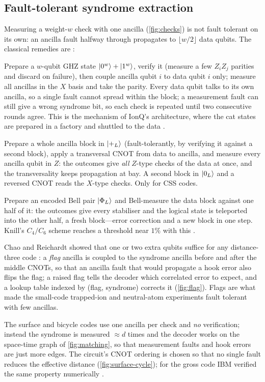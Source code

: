 \subsection{Fault-tolerant syndrome extraction}\label{sec:ftsyndrome}
Measuring a weight-$w$ check with one ancilla (\cref{fig:checks}) is not fault tolerant on its own: an ancilla fault halfway through propagates to $\lfloor w/2\rfloor$ data qubits. The classical remedies are \cite{shor96ft,steane97,knill05,chao-reichardt18}:
\begin{description}[leftmargin=*,style=nextline]
\item[Shor-style (cat states).] Prepare a $w$-qubit GHZ state $\lvert 0^w \rangle+\lvert 1^w \rangle$, verify it (measure a few $Z_iZ_j$ parities and discard on failure), then couple ancilla qubit $i$ to data qubit $i$ only; measure all ancillas in the $X$ basis and take the parity. Every data qubit talks to its own ancilla, so a single fault cannot spread within the block; a measurement fault can still give a wrong syndrome bit, so each check is repeated until two consecutive rounds agree. This is the mechanism of IonQ's architecture, where the cat states are prepared in a factory and shuttled to the data \cite{walkingcat26}.
\item[Steane-style (encoded ancilla).] Prepare a whole ancilla block in $\lvert +_L \rangle$ (fault-tolerantly, by verifying it against a second block), apply a transversal CNOT from data to ancilla, and measure every ancilla qubit in $Z$: the outcomes give \emph{all} $Z$-type checks of the data at once, and the transversality keeps propagation at bay. A second block in $\lvert 0_L \rangle$ and a reversed CNOT reads the $X$-type checks. Only for CSS codes.
\item[Knill-style (teleportation).] Prepare an encoded Bell pair $\lvert \Phi_L \rangle$ and Bell-measure the data block against one half of it: the outcomes give every stabiliser and the logical state is teleported into the other half, a fresh block---error correction and a new block in one step. Knill's $C_4/C_6$ scheme reaches a threshold near $1\%$ with this \cite{knill05}.
\item[Flag qubits.] Chao and Reichardt showed that one or two extra qubits suffice for any distance-three code \cite{chao-reichardt18}: a \emph{flag} ancilla is coupled to the syndrome ancilla before and after the middle CNOTs, so that an ancilla fault that would propagate a hook error also flips the flag; a raised flag tells the decoder which correlated error to expect, and a lookup table indexed by (flag, syndrome) corrects it (\cref{fig:flag}). Flags are what made the small-code trapped-ion and neutral-atom experiments fault tolerant with few ancillas.
\item[Repetition in time.] The surface and bicycle codes use one ancilla per check and \emph{no} verification; instead the syndrome is measured $\approx d$ times and the decoder works on the space-time graph of \cref{fig:matching}, so that measurement faults and hook errors are just more edges. The circuit's CNOT ordering is chosen so that no single fault reduces the effective distance (\cref{fig:surface-cycle}); for the gross code IBM verified the same property numerically \cite{bravyi24gross}.
\end{description}

